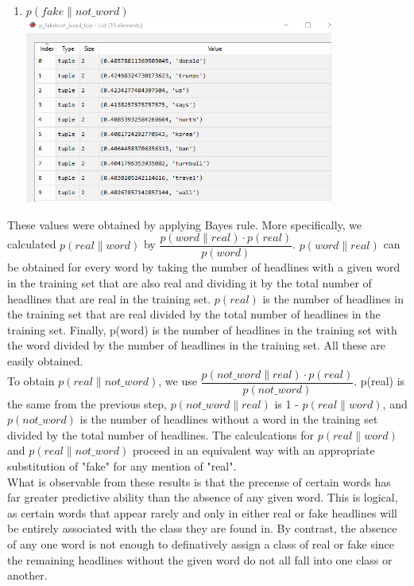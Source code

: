 \documentclass{article}
\begin{document}
\begin{enumerate}
\item $p(fake \| not\_word)$
\\
         \includegraphics[width=4in]{resources/part3/p(fakenotword)}

\end{enumerate}

These values were obtained by applying Bayes rule. More specifically, we calculated $p(real \| word)$ by $ \dfrac {p(word \| real) \cdot p(real)}{p(word)}$. $p(word \| real)$ can be obtained for every word by taking the number of headlines with a given word
in the training set that are also real and dividing it by the total number of headlines that are real in the training set. $p(real)$ is the number of headlines in the training set that are real divided by the total number of headlines in the training set. Finally, p(word) is the number of headlines in the training set with the word divided by the number of headlines in the training set. All these are easily obtained. 
\\
To obtain $p(real \| not\_word)$, we use $ \dfrac {p(not\_word \| real) \cdot p(real)}{p(not\_word)}$. p(real) is the same from the previous step, $p(not\_word \| real)$ is 1 - $p(real \| word)$, and $p(not\_word)$ is the number of headlines without a word in the training  set divided by the total number of headlines.
The calculcations for $p(real \| word)$ and $p(real \| not\_word)$ proceed in an equivalent way with an appropriate substitution of "fake" for any mention of "real".
\\
What is observable from these results is that the precense of certain words has far greater predictive ability than the absence of any given word. This is logical, as certain words that appear rarely and only in either real or fake headlines will be entirely associated
with the class they are found in. By contrast, the absence of any one word is not enough to definatively assign a class of real or fake since the remaining headlines without the given word do not all fall into one class or another. 
\end{document}
